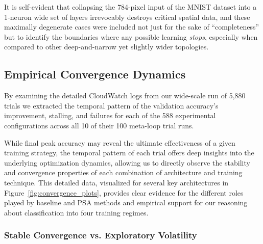 \documentclass[conference]{IEEEtran}
\begin{document}
It is self-evident that collapsing the 784-pixel input of the MNIST dataset into a 1-neuron wide set of layers irrevocably destroys critical spatial data, and these maximally degenerate cases were included not just for the sake of ``completeness'' but to identify the boundaries where any possible learning \textit{stops}, especially when compared to other deep-and-narrow yet slightly wider topologies.

\subsection{Empirical Convergence Dynamics}

By examining the detailed CloudWatch logs from our wide-scale run of 5,880 trials we extracted the temporal pattern of the validation accuracy's improvement, stalling, and failures for each of the 588 experimental configurations across all 10 of their 100 meta-loop trial runs.

While final peak accuracy may reveal the ultimate effectiveness of a given training strategy, the temporal pattern of each trial offers deep insights into the underlying optimization dynamics, allowing us to directly observe the stability and convergence properties of each combination of architecture and training technique. This detailed data, visualized for several key architectures in Figure~\ref{fig:convergence_plots}, provides clear evidence for the different roles played by baseline and PSA methods and empirical support for our reasoning about classification into four training regimes.

\subsubsection{Stable Convergence vs. Exploratory Volatility}
\end{document}
